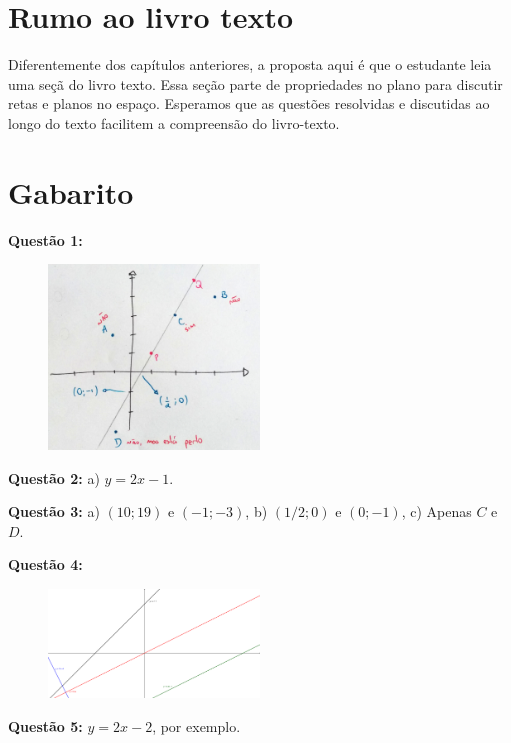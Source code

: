 \documentclass[main_estudante.tex]{subfiles}
\begin{document}
\section{Rumo ao livro texto}

Diferentemente dos capítulos anteriores, a proposta aqui é que o estudante leia uma seçã do livro texto. Essa seção parte de propriedades no plano para discutir retas e planos no espaço. Esperamos que as questões resolvidas e discutidas ao longo do texto facilitem a compreensão do livro-texto.

\section{Gabarito}

\noindent\textbf{Questão 1:} 

\begin{figure}[h]
\centering
\includegraphics[width=0.5\textwidth]{./img/c6g1.jpg}
\end{figure}

\noindent\textbf{Questão 2:} a) $y=2x-1$.

\noindent\textbf{Questão 3:} a) $(10;19)$ e $(-1;-3)$, b) $(1/2;0)$ e $(0;-1)$, c) Apenas $C$ e $D$.

\noindent\textbf{Questão 4:} 

\begin{figure}[h]
\centering
\includegraphics[width=0.5\textwidth]{./img/c6g4.png}
\end{figure}

\noindent\textbf{Questão 5:} $y=2x-2$, por exemplo.
\end{document}
